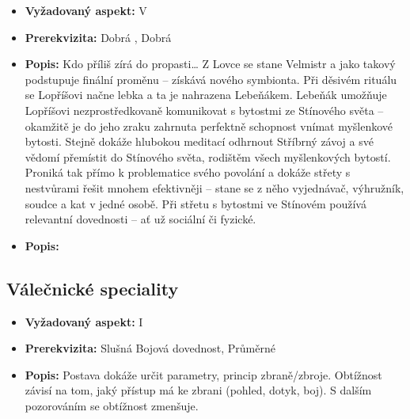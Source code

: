 \documentclass[../main.tex]{subfiles}
\begin{document}
\begin{specialita}[Lebeňák]
\begin{itemize}
	\item \textbf{Vyžadovaný aspekt:} V
	\item \textbf{Prerekvizita:} Dobrá , Dobrá 
	\item \textbf{Popis:} Kdo příliš zírá do propasti… Z Lovce se stane Velmistr a jako takový podstupuje finální proměnu – získává nového symbionta. Při děsivém rituálu se Lopříšovi načne lebka a ta je nahrazena Lebeňákem. Lebeňák umožňuje Lopříšovi nezprostředkovaně komunikovat s bytostmi ze Stínového světa – okamžitě je do jeho zraku zahrnuta perfektně schopnost vnímat myšlenkové bytosti. Stejně dokáže hlubokou meditací odhrnout Stříbrný závoj a své vědomí přemístit do Stínového světa, rodištěm všech myšlenkových bytostí. Proniká tak přímo k problematice svého povolání a dokáže střety s nestvůrami řešit mnohem efektivněji – stane se z něho vyjednávač, výhružník, soudce a kat v jedné osobě. Při střetu s bytostmi ve Stínovém používá relevantní dovednosti – ať už sociální či fyzické.
\end{itemize}
\end{specialita}

\begin{specialita}
\begin{itemize}
	\item \textbf{Popis:}
\end{itemize}
\end{specialita}


\subsection{Válečnické speciality}
\label{sec:lopr-val}

\begin{specialita}
\begin{itemize}
	\item \textbf{Vyžadovaný aspekt:} I
	\item \textbf{Prerekvizita:} Slušná Bojová dovednost, Průměrné 
	\item \textbf{Popis:} Postava dokáže určit parametry, princip zbraně/zbroje. Obtížnost závisí na tom, jaký přístup má ke zbrani (pohled, dotyk, boj). S dalším pozorováním se obtížnost zmenšuje.
\end{itemize}
\end{specialita}
\end{document}
